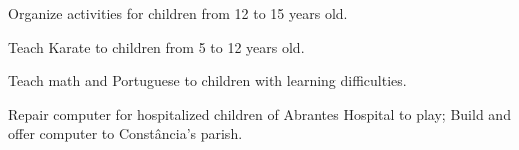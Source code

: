 \documentclass[10pt,a4paper,ragged2e,withhyper]{altacv}
\begin{document}
\begin{paracol}{2}
\medskip

\small Organize activities for children from 12 to 15 years old.

\medskip

\small Teach Karate to children from 5 to 12 years old.

\medskip

\small Teach math and Portuguese to children with learning difficulties.

\medskip

\small Repair computer for hospitalized children of Abrantes Hospital to play; Build and offer computer to Constância's parish.

\end{paracol}
\end{document}
